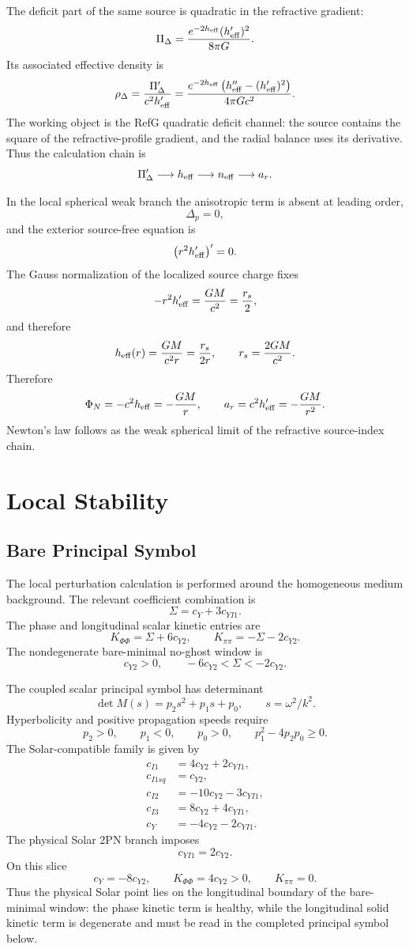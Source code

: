 \documentclass[12pt,a4paper]{article}
\begin{document}
The deficit part of the same source is quadratic in the refractive gradient:
\[
\Pi_\Delta=\frac{e^{-2h_{\rm eff}}(h_{\rm eff}')^2}{8\pi G}.
\]
Its associated effective density is
\[
\rho_\Delta=\frac{\Pi_\Delta'}{c^2h_{\rm eff}'}
=\frac{e^{-2h_{\rm eff}}\left(h_{\rm eff}''-(h_{\rm eff}')^2\right)}
{4\pi G c^2}.
\]
The working object is the RefG quadratic deficit channel:
the source contains the square of the refractive-profile gradient, and the
radial balance uses its derivative.
Thus the calculation chain is
\[
\Pi_\Delta' \longrightarrow h_{\rm eff} \longrightarrow n_{\rm eff}
\longrightarrow a_r.
\]

In the local spherical weak branch the anisotropic term is absent at leading order,
\[
\Delta_p=0,
\]
and the exterior source-free equation is
\[
\left(r^2h_{\rm eff}'\right)'=0.
\]
The Gauss normalization of the localized source charge fixes
\[
-r^2h_{\rm eff}'=\frac{GM}{c^2}=\frac{r_s}{2},
\]
and therefore
\[
h_{\rm eff}(r)=\frac{GM}{c^2r}=\frac{r_s}{2r},
\qquad r_s=\frac{2GM}{c^2}.
\]
Therefore
\[
\Phi_N=-c^2h_{\rm eff}=-\frac{GM}{r},
\qquad
a_r=c^2h_{\rm eff}'=-\frac{GM}{r^2}.
\]
Newton's law follows as the weak spherical limit of the refractive source-index chain.

\section{Local Stability}

\subsection{Bare Principal Symbol}

The local perturbation calculation is performed around the homogeneous medium background. The relevant coefficient combination is
\[
\Sigma=c_Y+3c_{YI1}.
\]
The phase and longitudinal scalar kinetic entries are
\[
K_{\Phi\Phi}=\Sigma+6c_{Y2},
\qquad
K_{\pi\pi}=-\Sigma-2c_{Y2}.
\]
The nondegenerate bare-minimal no-ghost window is
\[
c_{Y2}>0,\qquad
-6c_{Y2}<\Sigma<-2c_{Y2}.
\]

The coupled scalar principal symbol has determinant
\[
\det M(s)=p_2s^2+p_1s+p_0,\qquad s=\omega^2/k^2.
\]
Hyperbolicity and positive propagation speeds require
\[
p_2>0,\qquad p_1<0,\qquad p_0>0,\qquad
p_1^2-4p_2p_0\ge 0.
\]
The Solar-compatible family is given by
\begin{align*}
c_{I1}&=4c_{Y2}+2c_{YI1},\\
c_{I1sq}&=c_{Y2},\\
c_{I2}&=-10c_{Y2}-3c_{YI1},\\
c_{I3}&=8c_{Y2}+4c_{YI1},\\
c_Y&=-4c_{Y2}-2c_{YI1}.
\end{align*}
The physical Solar $2$PN branch imposes
\[
c_{YI1}=2c_{Y2}.
\]
On this slice
\[
c_Y=-8c_{Y2},\qquad
K_{\Phi\Phi}=4c_{Y2}>0,\qquad
K_{\pi\pi}=0.
\]
Thus the physical Solar point lies on the longitudinal boundary of the
bare-minimal window: the phase kinetic term is healthy, while the longitudinal
solid kinetic term is degenerate and must be read in the completed principal
symbol below.
\end{document}
